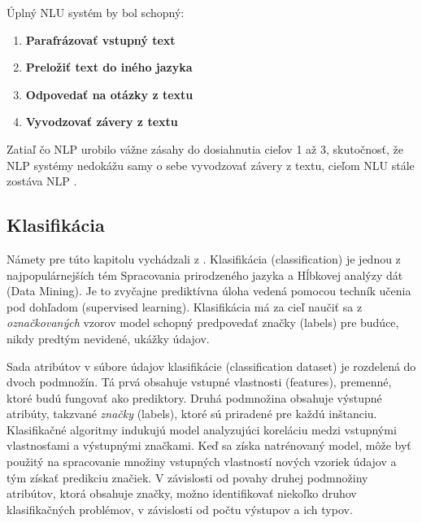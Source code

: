 Úplný NLU systém by bol schopný:

\begin{enumerate}
    \item \textbf{Parafrázovať vstupný text}
    \item \textbf{Preložiť text do iného jazyka}
    \item \textbf{Odpovedať na otázky z textu}
    \item \textbf{Vyvodzovať závery z textu}
\end{enumerate}

Zatiaľ čo NLP urobilo vážne zásahy do dosiahnutia cieľov 1 až 3, skutočnosť, že NLP systémy nedokážu samy o sebe vyvodzovať závery z textu, cieľom NLU stále zostáva NLP \cite{Liddy:2001} .

\subsection{Klasifikácia}
\label{klasifikacia}

Námety pre túto kapitolu vychádzali z \cite{Herrera:2016}. Klasifikácia (classification) je jednou z najpopulárnejších tém Spracovania prirodzeného jazyka a Hĺbkovej analýzy dát (Data Mining). Je to zvyčajne prediktívna úloha vedená pomocou techník učenia pod dohľadom (supervised learning). Klasifikácia má za cieľ naučiť sa z \textit{označkovaných} vzorov model schopný predpovedať značky (labels) pre budúce, nikdy predtým nevidené, ukážky údajov.

Sada atribútov v súbore údajov klasifikácie (classification dataset) je rozdelená do dvoch podmnožín. Tá prvá obsahuje vstupné vlastnosti (features), premenné, ktoré budú fungovať ako prediktory. Druhá podmnožina obsahuje výstupné atribúty, takzvané \textit{značky} (labels), ktoré sú priradené pre každú inštanciu. Klasifikačné algoritmy indukujú model analyzujúci koreláciu medzi vstupnými vlastnosťami a výstupnými značkami. Keď sa získa natrénovaný model, môže byť použitý na spracovanie množiny vstupných vlastností nových vzoriek údajov a tým získať predikciu značiek. V závislosti od povahy druhej podmnožiny atribútov, ktorá obsahuje značky, možno identifikovať niekoľko druhov klasifikačných problémov, v závislosti od počtu výstupov a ich typov. 

